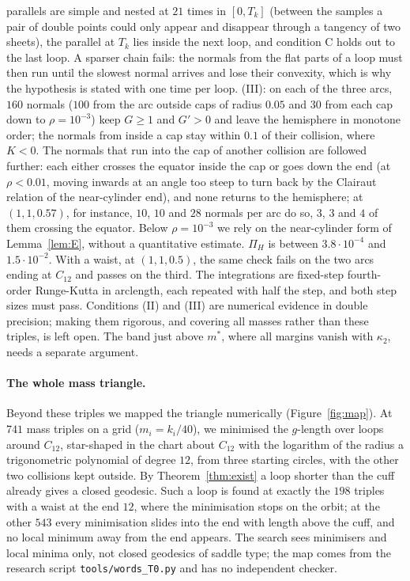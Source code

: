 \documentclass[11pt]{article}
\theoremstyle{definition}
\begin{document}
parallels are simple and nested at $21$ times in $[0,T_k]$ (between the samples a pair of double points could only
appear and disappear through a tangency of two sheets), the parallel at $T_k$ lies inside the next loop, and
condition C holds out to the last loop. A sparser chain fails: the normals from the flat parts of a loop must then run
until the slowest normal arrives and lose their convexity, which is why the hypothesis is stated with one time per
loop. (III): on each of the three arcs, $160$ normals ($100$ from the arc outside caps of radius $0.05$ and $30$ from each
cap down to $\rho=10^{-3}$) keep $G\ge1$ and $G'>0$ and leave the hemisphere in monotone order; the normals from inside
a cap stay within $0.1$ of their collision, where $K<0$. The normals that run into the cap of another collision are
followed further: each either crosses the equator inside the cap or goes down the end (at $\rho<0.01$, moving inwards
at an angle too steep to turn back by the Clairaut relation of the near-cylinder end), and none returns to the
hemisphere; at $(1,1,0.57)$, for instance, $10$, $10$ and $28$ normals per arc do so, $3$, $3$ and $4$ of them crossing
the equator. Below $\rho=10^{-3}$ we rely on the near-cylinder form of Lemma~\ref{lem:E}, without a
quantitative estimate. $\Pi_H$ is between $3.8\cdot10^{-4}$ and $1.5\cdot10^{-2}$. With a waist, at $(1,1,0.5)$, the
same check fails on the two arcs ending at $C_{12}$ and passes on the third. The integrations are fixed-step
fourth-order Runge-Kutta in arclength, each repeated with half the step, and both step sizes must pass. Conditions
(II) and (III) are numerical evidence in double precision; making them rigorous, and covering all masses rather than
these triples, is left open.
The band just above $m^*$, where all margins vanish with $\kappa_2$, needs a separate argument.

\paragraph{The whole mass triangle.} Beyond these triples we mapped the triangle numerically
(Figure~\ref{fig:map}). At $741$ mass triples on a grid ($m_i=k_i/40$), we minimised the $g$-length over loops around
$C_{12}$, star-shaped in the chart about $C_{12}$ with the logarithm of the radius a trigonometric polynomial of degree
$12$, from three starting circles, with the other two collisions kept outside. By Theorem~\ref{thm:exist} a loop
shorter than the cuff already gives a closed geodesic. Such a loop is found at exactly the $198$ triples with a waist at
the end $12$, where the minimisation stops on the orbit; at the other $543$ every minimisation slides into the end with
length above the cuff, and no local minimum away from the end appears. The search sees minimisers and local minima
only, not closed geodesics of saddle type; the map comes from the research script \texttt{tools/words\_T0.py}
and has no independent checker.
\end{document}
